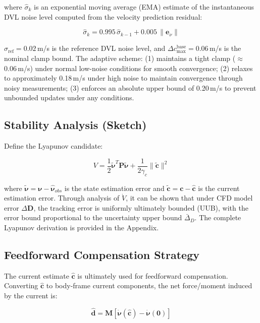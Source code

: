 where $\hat{\sigma}_k$ is an exponential moving average (EMA) estimate of the instantaneous DVL noise level computed from the velocity prediction residual:

\begin{equation}
    \hat{\sigma}_k = 0.995\,\hat{\sigma}_{k-1} + 0.005\,\|\bm{e}_{\nu}\|
    \label{eq:noise_est}
\end{equation}

$\sigma_{\text{ref}}=0.02$\,m/s is the reference DVL noise level, and $\Delta c_{\max}^{\text{base}}=0.06$\,m/s is the nominal clamp bound. The adaptive scheme: (1) maintains a tight clamp ($\approx$0.06\,m/s) under normal low-noise conditions for smooth convergence; (2) relaxes to approximately 0.18\,m/s under high noise to maintain convergence through noisy measurements; (3) enforces an absolute upper bound of 0.20\,m/s to prevent unbounded updates under any conditions.

\subsection{Stability Analysis (Sketch)}

Define the Lyapunov candidate:

\begin{equation}
    V = \frac{1}{2}\tilde{\bm{\nu}}^T\bm{P}\tilde{\bm{\nu}} + \frac{1}{2\gamma_c}\|\tilde{\bm{c}}\|^2
    \label{eq:lyapunov}
\end{equation}

where $\tilde{\bm{\nu}} = \bm{\nu} - \hat{\bm{\nu}}_{obs}$ is the state estimation error and $\tilde{\bm{c}} = \bm{c} - \hat{\bm{c}}$ is the current estimation error. Through analysis of $\dot{V}$, it can be shown that under CFD model error $\Delta\bm{D}$, the tracking error is uniformly ultimately bounded (UUB), with the error bound proportional to the uncertainty upper bound $\bar{\Delta}_D$. The complete Lyapunov derivation is provided in the Appendix.

\subsection{Feedforward Compensation Strategy}

The current estimate $\hat{\bm{c}}$ is ultimately used for feedforward compensation. Converting $\hat{\bm{c}}$ to body-frame current components, the net force/moment induced by the current is:

\begin{equation}
    \hat{\bm{d}} = \bm{M}\left[\dot{\bm{\nu}}(\hat{\bm{c}}) - \dot{\bm{\nu}}(\bm{0})\right]
    \label{eq:feedforward}
\end{equation}

